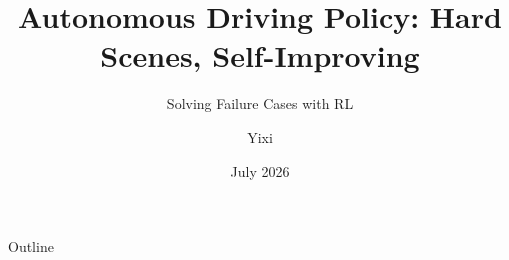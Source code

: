 \documentclass[aspectratio=169,11pt]{beamer}
\title{Autonomous Driving Policy: Hard Scenes, Self-Improving}
\subtitle{\small Solving Failure Cases with RL}
\author{Yixi}
\date{July 2026}
\begin{document}
\begin{frame}
  \titlepage
\end{frame}

\begin{frame}{Outline}
  \tableofcontents
\end{frame}





\end{document}
